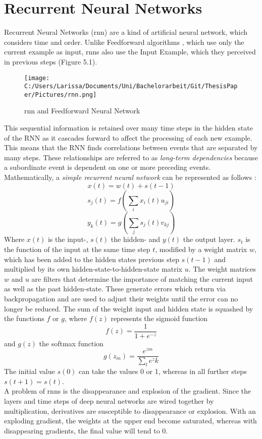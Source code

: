 \documentclass[a4paper, 11pt,titlepage,oneside,openany]{book}
\begin{document}
\section{Recurrent Neural Networks}
Recurrent Neural Networks (\gls{rnn}) are a kind of artificial neural network, which considers time and order. Unlike Feedforward algorithms \cite{feedforward}, which use only the current example as input, \gls{rnn}s also use the Input Example, which they perceived in previous steps (Figure 5.1). 
\begin{figure}
	\centering
	\texttt{[image: C:/Users/Larissa/Documents/Uni/Bachelorarbeit/Git/ThesisPaper/Pictures/rnn.png]}
	\caption{\gls{rnn} and Feedforward Neural Network \cite{rnn}}
\end{figure}
This sequential information is retained over many time steps in the hidden state of the RNN as it cascades forward to affect the processing of each new example. This means that the RNN finds correlations between events that are separated by many steps. These relationships are referred to as \textit{long-term dependencies} because a subordinate event is dependent on one or more preceding events.\\
\newpage
\noindent Mathematically, a \textit{simple recurrent neural network} \cite{ELMAN1990179} can be represented as follows \cite{rnnmodel}:
\[
x(t)=w(t)+s(t-1)
\]
\[
s_j(t)=f(\sum_{i}x_i(t)u_{ji})
\]
\[
y_k(t)=g(\sum_{j}s_j(t)v_{kj})
\]
Where $x(t)$ is the input-, $s(t)$ the hidden- and $y(t)$ the output layer. $s_t$ is the function of the input at the same time step $t$, modified by a weight matrix $w$, which has been added to the hidden states previous step $s(t-1)$ and multiplied by its own hidden-state-to-hidden-state matrix $u$. The weight matrices $w$ and $u$ are filters that determine the importance of matching the current input as well as the past hidden-state. These generate errors which return via backpropagation and are used to adjust their weights until the error can no longer be reduced. The sum of the weight input and hidden state is squashed by the functions $f$ or $g$, where  $f(z)$ represents the sigmoid function
\[
f(z)=\frac{1}{1+e^{-z}}
\]
and $g(z)$ the softmax function
\[
g(z_m)=\frac{e^{zm}}{\sum_{l}e^zk}
\]
The initial value $s(0)$ can take the values 0 or 1, whereas in all further steps $s(t+1)=s(t)$. \\
\noindent A problem of \gls{rnn}s is the disappearance and explosion of the gradient. Since the layers and time steps of deep neural networks are wired together by multiplication, derivatives are susceptible to disappearance or explosion. With an exploding gradient, the weights at the upper end become saturated, whereas with disappearing gradients, the final value will tend to 0.
\end{document}
